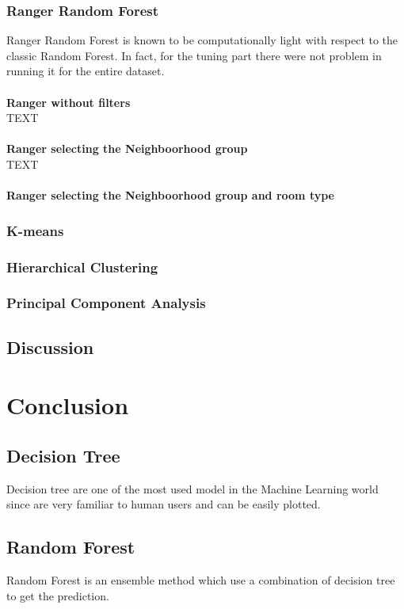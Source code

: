 \documentclass{FR16}
\begin{document}
\subsubsection{Ranger Random Forest}
Ranger Random Forest is known to be computationally light with respect to the classic Random Forest. In fact, for the tuning part there were not problem in running it for the entire dataset. 
\\\\ \textbf{Ranger without filters}\\
TEXT
\\\\
\textbf{Ranger selecting the Neighboorhood group}\\
TEXT
\\\\ 
\textbf{Ranger selecting the Neighboorhood group and room type}

\subsubsection{K-means}


\subsubsection{Hierarchical Clustering}

\subsubsection{Principal Component Analysis}

\subsection{Discussion}

\section{Conclusion}




\subsection{Decision Tree}
Decision  tree are one of the most used model in the Machine Learning world since are very familiar to human users and can be easily plotted. 
\\



\subsection{Random Forest}
Random Forest is an ensemble method which use a combination of decision tree to get the prediction.
\end{document}
